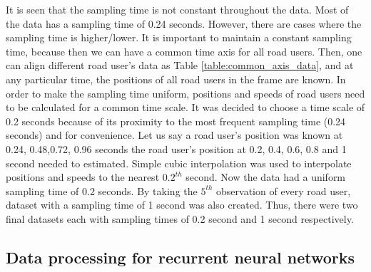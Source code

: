 \documentclass{article}
\begin{document}
It is seen that the sampling time is not constant throughout the data. Most of the data has a sampling time of 0.24 seconds. However, there are cases where the sampling time is higher/lower. It is important to maintain a constant sampling time, because then we can have a common time axis for all road users. Then, one can align different road user's data as Table \ref{table:common_axis_data}, and at any particular time, the positions of all road users in the frame are known. In order to make the sampling time uniform, positions and speeds of road users need to be calculated for a common time scale. It was decided to choose a time scale of 0.2 seconds because of its proximity to the most frequent sampling time (0.24 seconds) and for convenience. Let us say a road user's position was known at 0.24, 0.48,0.72, 0.96 seconds the road user's position at 0.2, 0.4, 0.6, 0.8 and 1 second needed to estimated. Simple cubic interpolation was used to interpolate positions and speeds to the nearest $0.2^{th}$ second. Now the data had a uniform sampling time of 0.2 seconds. By taking the $5^{th}$ observation of every road user, dataset with a sampling time of 1 second was also  created.  Thus, there were two final datasets each with sampling times of 0.2 second and 1 second respectively. 

\subsection{Data processing for recurrent neural networks}
\end{document}
